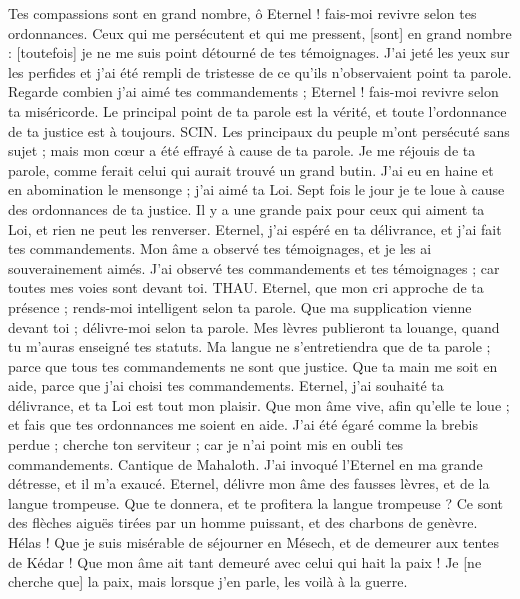 \begin{multicols}{2}
Tes compassions sont en grand nombre, ô Eternel ! fais-moi revivre selon tes ordonnances.
Ceux qui me persécutent et qui me pressent, [sont] en grand nombre : [toutefois] je ne me suis point détourné de tes témoignages.
J'ai jeté les yeux sur les perfides et j'ai été rempli de tristesse de ce qu'ils n'observaient point ta parole.
Regarde combien j'ai aimé tes commandements ; Eternel ! fais-moi revivre selon ta miséricorde.
Le principal point de ta parole est la vérité, et toute l'ordonnance de ta justice est à toujours.
SCIN. Les principaux du peuple m'ont persécuté sans sujet ; mais mon cœur a été effrayé à cause de ta parole.
Je me réjouis de ta parole, comme ferait celui qui aurait trouvé un grand butin.
J'ai eu en haine et en abomination le mensonge ; j'ai aimé ta Loi.
Sept fois le jour je te loue à cause des ordonnances de ta justice.
Il y a une grande paix pour ceux qui aiment ta Loi, et rien ne peut les renverser.
Eternel, j'ai espéré en ta délivrance, et j'ai fait tes commandements.
Mon âme a observé tes témoignages, et je les ai souverainement aimés.
J'ai observé tes commandements et tes témoignages ; car toutes mes voies sont devant toi.
THAU. Eternel, que mon cri approche de ta présence ; rends-moi intelligent selon ta parole.
Que ma supplication vienne devant toi ; délivre-moi selon ta parole.
Mes lèvres publieront ta louange, quand tu m'auras enseigné tes statuts.
Ma langue ne s'entretiendra que de ta parole ; parce que tous tes commandements ne sont que justice.
Que ta main me soit en aide, parce que j'ai choisi tes commandements.
Eternel, j'ai souhaité ta délivrance, et ta Loi est tout mon plaisir.
Que mon âme vive, afin qu'elle te loue ; et fais que tes ordonnances me soient en aide.
J'ai été égaré comme la brebis perdue ; cherche ton serviteur ; car je n'ai point mis en oubli tes commandements.
\VerseOne{}Cantique de Mahaloth. J'ai invoqué l'Eternel en ma grande détresse, et il m'a exaucé.
Eternel, délivre mon âme des fausses lèvres, et de la langue trompeuse.
Que te donnera, et te profitera la langue trompeuse ?
Ce sont des flèches aiguës tirées par un homme puissant, et des charbons de genèvre.
Hélas ! Que je suis misérable de séjourner en Mésech, et de demeurer aux tentes de Kédar !
Que mon âme ait tant demeuré avec celui qui hait la paix !
Je [ne cherche que] la paix, mais lorsque j'en parle, les voilà à la guerre.

\end{multicols}
